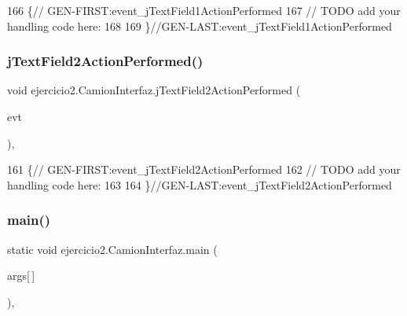 \begin{DoxyCode}
166                                                                             \{\textcolor{comment}{//
      GEN-FIRST:event\_jTextField1ActionPerformed}
167         \textcolor{comment}{// TODO add your handling code here:}
168         
169     \}\textcolor{comment}{//GEN-LAST:event\_jTextField1ActionPerformed}
\end{DoxyCode}
\mbox{\label{classejercicio2_1_1_camion_interfaz_afc95c6247a265c4899531f4883bc5e75}} 
\subsubsection{\texorpdfstring{j\+Text\+Field2\+Action\+Performed()}{jTextField2ActionPerformed()}}
{\footnotesize\ttfamily void ejercicio2.\+Camion\+Interfaz.\+j\+Text\+Field2\+Action\+Performed (\begin{DoxyParamCaption}\item[{java.\+awt.\+event.\+Action\+Event}]{evt }\end{DoxyParamCaption})\hspace{0.3cm}{\ttfamily [inline]}, {\ttfamily [private]}}


\begin{DoxyCode}
161                                                                             \{\textcolor{comment}{//
      GEN-FIRST:event\_jTextField2ActionPerformed}
162         \textcolor{comment}{// TODO add your handling code here:}
163         
164     \}\textcolor{comment}{//GEN-LAST:event\_jTextField2ActionPerformed}
\end{DoxyCode}
\mbox{\label{classejercicio2_1_1_camion_interfaz_aa938c4f6c6d04841d1258d1ee696e9f5}} 
\subsubsection{\texorpdfstring{main()}{main()}}
{\footnotesize\ttfamily static void ejercicio2.\+Camion\+Interfaz.\+main (\begin{DoxyParamCaption}\item[{String}]{args\mbox{[}$\,$\mbox{]} }\end{DoxyParamCaption})\hspace{0.3cm}{\ttfamily [inline]}, {\ttfamily [static]}}


